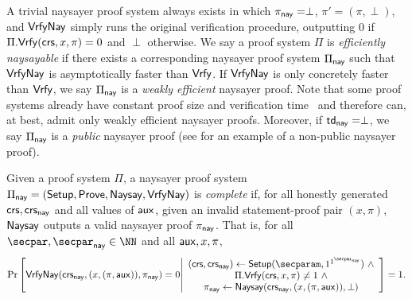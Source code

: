 A trivial naysayer proof system always exists in which $\pi_{\mathsf{nay}} = \perp$, $\pi' = (\pi, \perp)$, and ${\mathsf{Vrfy}}\mathsf{Nay}$ simply runs the original verification procedure, outputting $0$ if $\Pi.\mathsf{Vrfy}(\mathsf{crs}, x, \pi) = 0$ and $\perp$ otherwise.
We say a proof system $\Pi$ is \emph{efficiently naysayable} if there exists a corresponding naysayer proof system $\Pi_{\mathsf{nay}}$ such that ${\mathsf{Vrfy}}\mathsf{Nay}$ is asymptotically faster than $\mathsf{Vrfy}$. If ${\mathsf{Vrfy}}\mathsf{Nay}$ is only concretely faster than $\mathsf{Vrfy}$, we say $\Pi_{\mathsf{nay}}$ is a \emph{weakly efficient} naysayer proof. Note that some proof systems already have constant proof size and verification time~\cite{EC:Groth16,C:Schnorr89} and therefore can, at best, admit only weakly efficient naysayer proofs. 
Moreover, if $\mathsf{td}_{\mathsf{nay}} = \perp$, we say $\Pi_{\mathsf{nay}}$ is a \emph{public} naysayer proof (see  for an example of a non-public naysayer proof). 

\begin{definition}
    Given a proof system $\Pi$, a naysayer proof system $\Pi_{\mathsf{nay}} = (\mathsf{Setup}, \mathsf{Prove}, \mathsf{Naysay}, {\mathsf{Vrfy}}\mathsf{Nay})$ is \emph{complete} if, for all honestly generated $\mathsf{crs}, \mathsf{crs}_{\mathsf{nay}}$ and all values of $\mathsf{aux}$,\footnotemark
    given an invalid statement-proof pair $(x,\pi)$, $\mathsf{Naysay}$ outputs a valid naysayer proof $\pi_{\mathsf{nay}}$. That is, for all $\secpar, \naysecpar \in \NN$ and all $\mathsf{aux},x,\pi$,
\begin{equation*}
    \Pr\left[
        \vrfynay(\crs_{\nay}, (x,(\pi, \aux)), \pi_{\nay})=0 
        \middle| 
        \begin{array}{c}
            (\crs, \crs_{\nay}) \gets \setup(\secparam, 1^{\naysecparam})~\land\\
            \Pi.\vrfy(\crs, x,\pi) \neq 1~\land\\
            \pi_{\nay} \gets \naysay(\crs_{\nay}, (x, (\pi, \aux)), \perp)
        \end{array}
    \right] = 1.
\end{equation*}
\end{definition}

